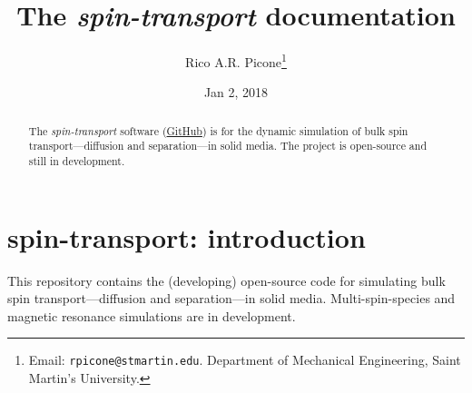 \documentclass[%
oneside,                 %
final,                   %
10pt]{article}
\let\oldtoc\tableofcontents
\renewcommand{\tableofcontents}{{\sffamily\oldtoc}}
\begin{document}

\newcommand{\exercisesection}[1]{\subsection*{#1}}







\title{\sffamily\bfseries{}The \emph{spin-transport} documentation}


\author{\sffamily{}Rico A.R. Picone\footnote{Email: \texttt{rpicone@stmartin.edu}. Department of Mechanical Engineering, Saint Martin's University.}}


\date{\sffamily{}Jan 2, 2018}
\maketitle

\begin{abstract}
The \emph{spin-transport} software (\href{{https://github.com/ricopicone/spin-transport}}{GitHub}) is for the dynamic simulation of bulk spin transport---diffusion and separation---in solid media.
The project is open-source and still in development.
\end{abstract}

\tableofcontents


\vspace{1cm} %






\section{spin-transport: introduction}

This repository contains the (developing) open-source code for simulating bulk spin transport---diffusion and separation---in solid media. Multi-spin-species and magnetic resonance simulations are in development.
\end{document}
